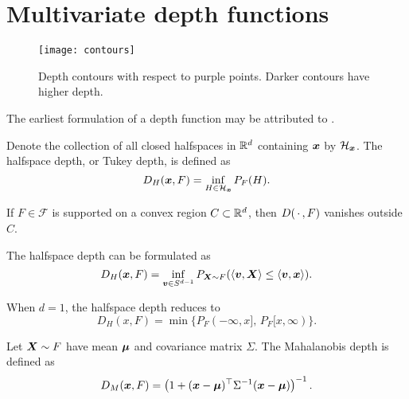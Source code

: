 \section{Multivariate depth functions}

\begin{figure}
    \centering
    \texttt{[image: contours]}
    \caption{
        Depth contours with respect to purple points.
        Darker contours have higher depth.
    }
    \label{fig:depthcontours}
\end{figure}


The earliest formulation of a depth function may be attributed to
\textcite{tukey-1975}.

\begin{definition}
    Denote the collection of all closed halfspaces in $\mathbb{R}^d$ containing $\bm{x}$
    by $\mathcal{H}_{\bm{x}}$.
    The halfspace depth, or Tukey depth, is defined as
    \begin{equation}
        D_H(\bm{x}, F) = \inf_{H \in \mathcal{H}_{\bm{x}}} P_{F}(H).
    \end{equation}
\end{definition}

\begin{remark}
    If $F \in \mathscr{F}$ is supported on a convex region $C \subset \mathbb{R}^d$,
    then $D(\,\cdot\,, F)$ vanishes outside $C$.
\end{remark}

\begin{proposition}
    The halfspace depth can be formulated as
    \begin{equation}
        D_H(\bm{x}, F) = \inf_{\bm{v} \in S^{d - 1}} P_{\bm{X} \sim F}(\langle \bm{v}, \bm{X} \rangle \leq \langle \bm{v}, \bm{x} \rangle).
    \end{equation}
\end{proposition}

\begin{remark}
    When $d = 1$, the halfspace depth reduces to
    \begin{equation}
        D_H(x, F) = \min\{P_F(-\infty, x],\, P_F[x, \infty)\}.
    \end{equation}
\end{remark}



\begin{definition}
    Let $\bm{X} \sim F$ have mean $\bm{\mu}$ and covariance matrix $\Sigma$.
    The Mahalanobis depth is defined as
    \begin{equation}
        D_{M}(\bm{x}, F) = \left(1 + (\bm{x} - \bm{\mu})^\top \Sigma^{-1}(\bm{x} - \bm{\mu})\right)^{-1}.
    \end{equation}
\end{definition}

